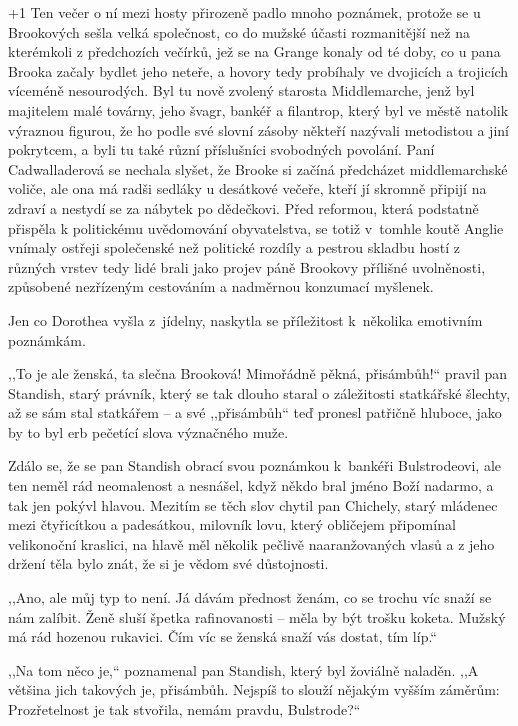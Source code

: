 \looseness+1
Ten večer o ní mezi hosty přirozeně padlo mnoho poznámek, protože se u Brookových sešla velká společnost, co do mužské účasti rozmanitější než na kterémkoli z předchozích večírků, jež se na Grange konaly od té doby, co u pana Brooka začaly bydlet jeho neteře, a hovory tedy probíhaly ve dvojicích a trojicích víceméně  nesourodých. Byl tu nově zvolený starosta Middlemarche, jenž byl majitelem malé továrny, jeho švagr, bankéř a filantrop, který byl ve městě natolik výraznou figurou, že ho podle své slovní zásoby někteří nazývali metodistou a jiní pokrytcem, a byli tu také různí příslušníci svobodných povolání. Paní Cadwalladerová se nechala slyšet, že Brooke si začíná předcházet middlemarchské voliče, ale ona má radši sedláky u desátkové večeře, kteří jí skromně připijí na zdraví a nestydí se za nábytek po dědečkovi. Před reformou, která podstatně přispěla k politickému uvědomování obyvatelstva, se totiž v tomhle koutě Anglie vnímaly ostřeji společenské než politické rozdíly a pestrou skladbu hostí z různých vrstev tedy lidé brali jako projev páně Brookovy přílišné uvolněnosti, způsobené nezřízeným cestováním a nadměrnou konzumací myšlenek.       

Jen co Dorothea vyšla z jídelny, naskytla se příležitost k několika emotivním poznámkám.

,,To je ale ženská, ta slečna Brooková! Mimořádně pěkná, přisámbůh!`` pravil pan Standish, starý právník, který se tak dlouho staral o záležitosti statkářské šlechty, až se sám stal statkářem -- a své ,,přisámbůh`` teď pronesl patřičně hluboce, jako by to byl erb pečetící slova význačného muže.

Zdálo se, že se pan Standish obrací svou poznámkou k bankéři Bulstrodeovi, ale ten neměl rád neomalenost a nesnášel, když někdo bral jméno Boží nadarmo, a tak jen pokývl hlavou. Mezitím se těch slov chytil pan Chichely, starý mládenec mezi čtyřicítkou a padesátkou, milovník lovu, který obličejem připomínal velikonoční kraslici, na hlavě měl několik pečlivě naaranžovaných vlasů a z jeho držení těla bylo znát, že si je vědom své důstojnosti. 

,,Ano, ale můj typ to není. Já dávám přednost ženám, co se trochu víc snaží se nám zalíbit. Ženě sluší špetka rafinovanosti -- měla by být trošku koketa. Mužský má rád hozenou rukavici. Čím víc se ženská snaží vás dostat, tím líp.``

,,Na tom něco je,`` poznamenal pan Standish, který byl žoviálně naladěn. ,,A většina jich takových je, přisámbůh. Nejspíš to slouží nějakým vyšším záměrům: Prozřetelnost je tak stvořila, nemám pravdu, Bulstrode?``


